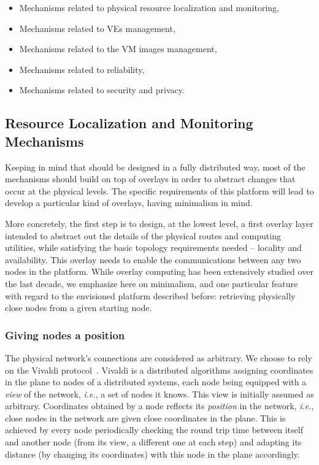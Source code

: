 \begin{itemize}
\item Mechanisms related to physical resource localization and monitoring, 
\item Mechanisms related to VEs management, 
\item Mechanisms related to the VM images management, 
\item Mechanisms related to reliability,
\item Mechanisms related to security and privacy.
\end{itemize}

\subsection{Resource Localization and Monitoring Mechanisms\label{ssec:p2p}}

Keeping in mind that \discovery should be designed in a fully distributed way,
most of the mechanisms should build on top of overlays in order to abstract changes
that occur at the physical levels. The specific requirements of this platform
will lead to develop a particular kind of overlays, having minimalism in mind.

More concretely, the first step is to design, at the lowest level, a first
overlay layer intended to abstract out the details of the physical routes and
computing utilities, while satisfying the basic topology requirements needed --
locality and availability. This overlay needs to enable the communications
between any two nodes in the platform. While overlay computing has been
extensively studied over the last decade, we emphasize here on minimalism, and
one particular feature with regard to the envisioned platform described before:
retrieving physically close nodes from a given starting node.

\subsubsection*{Giving nodes a position}

The physical network's connections are considered as arbitrary. We choose to
rely on the Vivaldi protocol~\cite{dabek:2001:sigcomm04}. Vivaldi is a
distributed algorithms assigning coordinates in the plane to nodes of a
distributed systems, each node being equipped with a \emph{view} of the network,
\emph{i.e.}, a set of nodes it knows. This view is initially assumed as
arbitrary. Coordinates obtained by a node reflects its \emph{position} in the
network, \emph{i.e.}, close nodes in the network are given close coordinates in
the plane. This is achieved by every node periodically checking the round trip
time between itself and another node (from its view, a different one at each
step) and adapting its distance (by changing its coordinates) with this node in
the plane accordingly. 

